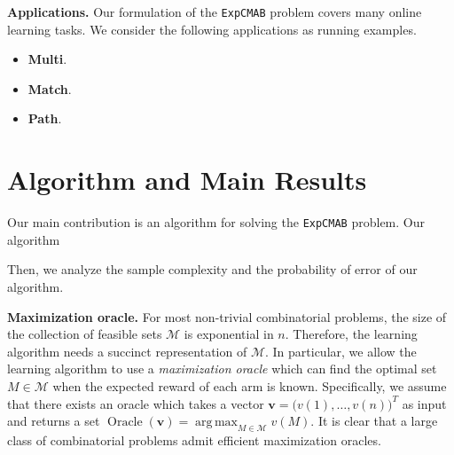 \documentclass{article}
\newcommand{\Problem}{\texttt{ExpCMAB}\xspace}
\newcommand{\M}{\mathcal M}
\newcommand{\RR}{\mathbb R}
\DeclareMathOperator*{\argmax}{arg\,max}
\DeclareMathOperator{\Oracle}{Oracle}
\newcommand{\MultiIdent}{\textbf{Multi}\xspace}
\newcommand{\Match}{\textbf{Match}\xspace}
\newcommand{\Path}{\textbf{Path}\xspace}
\renewcommand{\vec}[1]{\boldsymbol{#1}}
\begin{document}
\begin{spacing}{1.1}
\textbf{Applications.} 
Our formulation of the \Problem problem covers many online learning tasks.
We consider the following applications as running examples.

\begin{itemize}
\item \MultiIdent.
\item \Match.
\item \Path.
\end{itemize}



\section{Algorithm and Main Results}
Our main contribution is an algorithm for solving the \Problem problem.
Our algorithm 

Then, we analyze the sample complexity and the probability of error of our algorithm.



\textbf{Maximization oracle.}
For most non-trivial combinatorial problems, the size of the collection of feasible sets $\M$ is exponential in $n$.
Therefore, the learning algorithm needs a succinct representation of $\M$.
In particular, we allow the learning algorithm to use a \emph{maximization oracle} which can find the optimal set $M\in \M$ when the expected reward of each arm is known.
Specifically, we assume that there exists an oracle which takes a vector $\vec v = \big(v(1),\ldots,v(n)\big)^T$ as input and returns a set $\Oracle(\vec v) = \argmax_{M\in \M} v(M)$.
It is clear that a large class of combinatorial problems admit efficient maximization oracles.



\end{spacing}
\end{document}
